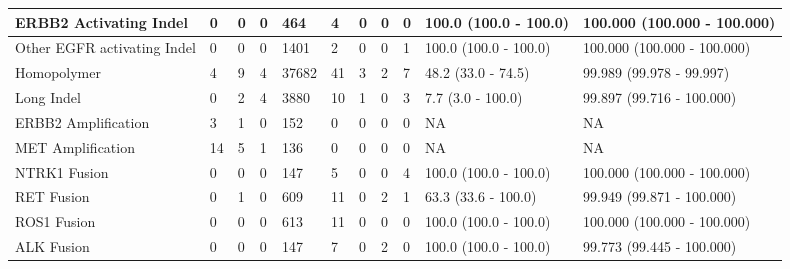 \begin{tabular}{|l|l|l|l|l|l|l|l|l|l|l|}
ERBB2 Activating Indel      &      0 &      0 &      0 &    464 &      4 &      0 &      0 &      0 &  100.0 (100.0 - 100.0) &  100.000 (100.000 - 100.000) \\ \hline
Other EGFR activating Indel &      0 &      0 &      0 &   1401 &      2 &      0 &      0 &      1 &  100.0 (100.0 - 100.0) &  100.000 (100.000 - 100.000) \\ \hline
Homopolymer                 &      4 &      9 &      4 &  37682 &     41 &      3 &      2 &      7 &     48.2 (33.0 - 74.5) &     99.989 (99.978 - 99.997) \\ \hline
Long Indel                  &      0 &      2 &      4 &   3880 &     10 &      1 &      0 &      3 &      7.7 (3.0 - 100.0) &    99.897 (99.716 - 100.000) \\ \hline
ERBB2 Amplification         &      3 &      1 &      0 &    152 &      0 &      0 &      0 &      0 &                     NA &                           NA \\ \hline
MET Amplification           &     14 &      5 &      1 &    136 &      0 &      0 &      0 &      0 &                     NA &                           NA \\ \hline
NTRK1 Fusion                &      0 &      0 &      0 &    147 &      5 &      0 &      0 &      4 &  100.0 (100.0 - 100.0) &  100.000 (100.000 - 100.000) \\ \hline
RET Fusion                  &      0 &      1 &      0 &    609 &     11 &      0 &      2 &      1 &    63.3 (33.6 - 100.0) &    99.949 (99.871 - 100.000) \\ \hline
ROS1 Fusion                 &      0 &      0 &      0 &    613 &     11 &      0 &      0 &      0 &  100.0 (100.0 - 100.0) &  100.000 (100.000 - 100.000) \\ \hline
ALK Fusion                  &      0 &      0 &      0 &    147 &      7 &      0 &      2 &      0 &  100.0 (100.0 - 100.0) &    99.773 (99.445 - 100.000) \\ \hline
\end{tabular}